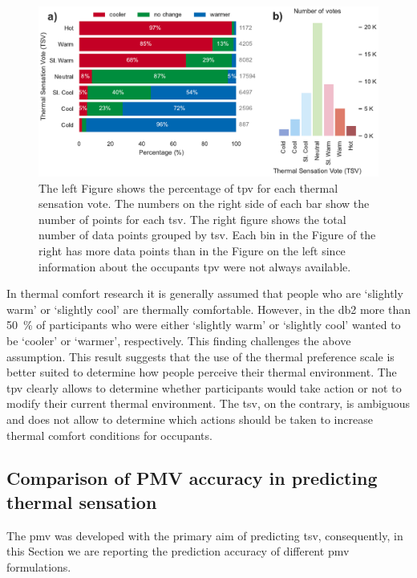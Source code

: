 \begin{figure}[htb!]
    \centering
    \includegraphics[width=\textwidth]{figures/bar_plot_tp_by_ts}
    \caption{The left Figure shows the percentage of \ac{tpv} for each thermal sensation vote.
    The numbers on the right side of each bar show the number of points for each \ac{tsv}.
    The right figure shows the total number of data points grouped by \ac{tsv}.
    Each bin in the Figure of the right has more data points than in the Figure on the left since information about the occupants \ac{tpv} were not always available.}
    \label{fig:bar_plot_tp_by_ts}
\end{figure}
In thermal comfort research it is generally assumed that people who are `slightly warm' or `slightly cool' are thermally comfortable.
However, in the \gls{db2} more than \qty{50}{\percent} of participants who were either `slightly warm' or `slightly cool' wanted to be `cooler' or `warmer', respectively.
This finding challenges the above assumption.
This result suggests that the use of the thermal preference scale is better suited to determine how people perceive their thermal environment.
The \ac{tpv} clearly allows to determine whether participants would take action or not to modify their current thermal environment.
The \ac{tsv}, on the contrary, is ambiguous and does not allow to determine which actions should be taken to increase thermal comfort conditions for occupants.

\subsection{Comparison of PMV accuracy in predicting thermal sensation}\label{subsec:model-accuracy-comparison-in-predicting-thermal-sensation}
The \ac{pmv} was developed with the primary aim of predicting \ac{tsv}, consequently, in this Section we are reporting the prediction accuracy of different \ac{pmv} formulations.


